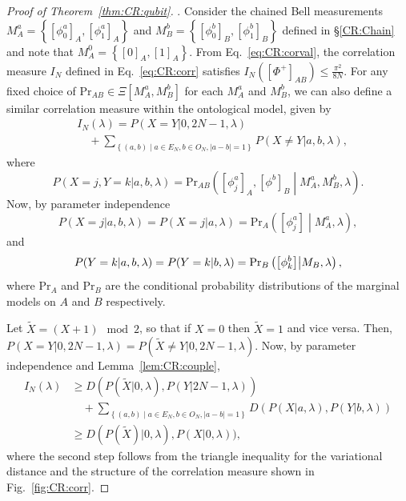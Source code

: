 \documentclass[DIV=calc,fontsize=12pt]{scrartcl} %
\theoremstyle{definition}
\theoremstyle{plain}
\newcommand{\Proj}[1]{\ensuremath{\left [ #1 \right ]}}
\begin{document}
\begin{proof}[Proof of Theorem~\ref{thm:CR:qubit}].  Consider the
chained Bell measurements $M^a_A = \left \{ \Proj{\phi^a_0}_A,
\Proj{\phi^a_1}_A \right \}$ and $M^b_B = \left \{
\Proj{\phi^b_0}_B,\allowbreak \Proj{\phi^b_1}_B\right \}$ defined
in \S\ref{CR:Chain} and note that $M^0_A = \left \{ \Proj{0}_A,
\Proj{1}_A \right \}$.  From Eq.~\eqref{eq:CR:corval}, the
correlation measure $I_N$ defined in Eq.~\eqref{eq:CR:corr}
satisfies $I_N \left ( \Proj{\Phi^+}_{AB} \right ) \leq
\frac{\pi^2}{8N}$.  For any fixed choice of $\text{Pr}_{AB} \in
\Xi[M_A^a,M_B^b]$ for each $M^a_A$ and $M^b_B$, we can also define a
similar correlation measure within the ontological model, given by
\begin{align}
\label{eq:CR:corront}
&I_N(\lambda) = P(X=Y|0,2N-1,\lambda) \nonumber\\
&\quad + \sum_{\left \{(a,b)
\middle | a \in E_N, b \in O_N, |a-b| = 1 \right \}} P(X \neq
Y|a,b,\lambda),
\end{align}
where
\begin{equation}
P(X=j,Y=k|a,b,\lambda) = \text{Pr}_{AB} \left ( \Proj{\phi^a_j}_A,
\Proj{\phi^b}_B \middle | M^a_A,M^b_B,\lambda \right ).
\end{equation}
Now, by parameter independence
\begin{equation}
\label{eq:CR:presponse1}
P(X = j|a,b,\lambda) = P(X = j|a,\lambda) =
\text{Pr}_A \left ( \Proj{\phi^a_j} \middle | M_A^a,\lambda \right ),
\end{equation}
and
\begin{equation}
\label{eq:CR:presponse2}
P(Y = k|a,b,\lambda) = P(Y = k|b,\lambda) \\ =
\text{Pr}_B \left ( \Proj{\phi^b_k} \middle | M_B, \lambda \right ),
\end{equation}
where $\text{Pr}_A$ and $\text{Pr}_B$ are the conditional
probability distributions of the marginal models on $A$ and $B$
respectively.

Let $\tilde{X} = (X + 1) \mod 2$, so that if $X = 0$ then $\tilde{X}
= 1$ and vice versa.  Then, $P(X=Y|0,2N-1,\lambda) = P(\tilde{X}
\neq Y|0,2N-1,\lambda)$.  Now, by parameter independence and
Lemma~\ref{lem:CR:couple},
\begin{align}
I_N(\lambda) & \geq D(P(\tilde{X}|0,\lambda), P(Y|2N-1,\lambda)) \nonumber\\
&\quad +
\sum_{\left \{(a,b) \middle | a \in E_N, b \in O_N, |a-b| = 1
\right \}}
D(P(X|a,\lambda), P(Y|b,\lambda)) \\
& \geq D(P(\tilde{X})|0,\lambda),
P(X|0,\lambda)), \label{eq:CR:ontcor}
\end{align}
where the second step follows from the triangle inequality for the
variational distance and the structure of the correlation measure
shown in Fig.~\ref{fig:CR:corr}.


\end{proof}
\end{document}
